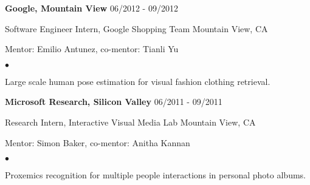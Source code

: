 \documentclass[margin]{res3}
\newenvironment{list1}{
  \begin{list}{\ding{113}}{%
      \setlength{\itemsep}{0.03in}
      \setlength{\parsep}{0in} \setlength{\parskip}{0in}
      \setlength{\topsep}{0in} \setlength{\partopsep}{0in}
      \setlength{\leftmargin}{0in}}}{\end{list}}
\newenvironment{list2}{
  \begin{list}{$\bullet$}{%
      \setlength{\itemsep}{0.02in}
      \setlength{\parsep}{0in} \setlength{\parskip}{0in}
      \setlength{\topsep}{0in} \setlength{\partopsep}{0in}
      \setlength{\leftmargin}{0.2in}}}{\end{list}}
\begin{document}
\begin{resume}
\begin{list1}
\item[] {\bf Google, Mountain View} \hfill {06/2012 - 09/2012}
\vspace{-2pt}
\item[] Software Engineer Intern, Google Shopping Team \hfill {Mountain View, CA}
\vspace{-2pt}
\item[] Mentor: Emilio Antunez, co-mentor: Tianli Yu

\begin{list2}
\item Large scale human pose estimation for visual fashion clothing retrieval.
\end{list2}
\vspace{5pt}


\item[] {\bf Microsoft Research, Silicon Valley} \hfill {06/2011 - 09/2011}
\vspace{-2pt}
\item[] Research Intern, Interactive Visual Media Lab \hfill{Mountain View, CA}
\vspace{-2pt}
\item[] Mentor: Simon Baker, co-mentor: Anitha Kannan

\begin{list2}
\item Proxemics recognition for multiple people interactions in personal photo albums.
\end{list2}
\vspace{5pt}



\end{list1}
\end{resume}
\end{document}
